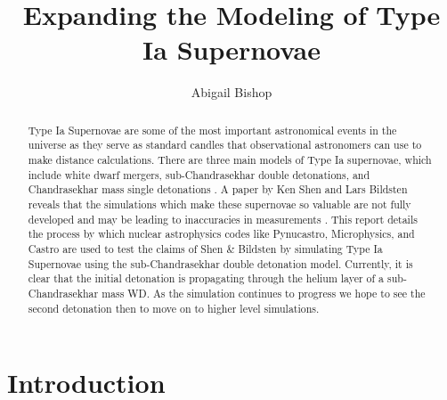 \documentclass[preprint]{aastex62}
\begin{document}
\title{Expanding the Modeling of Type Ia Supernovae}
\author{Abigail Bishop}

  

\begin{abstract}
  
  Type Ia Supernovae are some of the most important astronomical events in the universe as they serve as standard candles that observational astronomers can use to make distance calculations. There are three main models of Type Ia supernovae, which include white dwarf mergers, sub-Chandrasekhar double detonations, and Chandrasekhar mass single detonations \citep{doubledet1, doubledet2}. A paper by Ken Shen and Lars Bildsten reveals that the simulations which make these supernovae so valuable are not fully developed and may be leading to inaccuracies in measurements \citep{shenNbildsten}. This report details the process by which nuclear astrophysics codes like Pynucastro, Microphysics, and Castro are used to test the claims of Shen \& Bildsten by simulating Type Ia Supernovae using the sub-Chandrasekhar double detonation model. Currently, it is clear that the initial detonation is propagating through the helium layer of a sub-Chandrasekhar mass WD. As the simulation continues to progress we hope to see the second detonation then to move on to higher level simulations.

\end{abstract}

\pagebreak

\section{Introduction}
\end{document}
